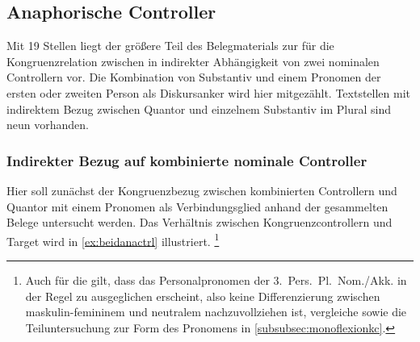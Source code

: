 
\subsection{Anaphorische Controller}

Mit 19 Stellen liegt der größere Teil des Belegmaterials zur \citet{kc} für die
Kongruenzrelation zwischen  in indirekter Abhängigkeit von zwei
nominalen Controllern vor. Die Kombination von Substantiv und einem Pronomen
der ersten oder zweiten Person als Diskurs\-anker wird hier mitgezählt.
Textstellen mit indirektem Bezug zwischen Quantor und einzelnem Substantiv im
Plural sind neun vorhanden.

\subsubsection{Indirekter Bezug auf kombinierte nominale Controller}
\label{subsubssec:iconomctrlpers}

Hier soll zunächst der Kongruenzbezug zwischen kombinierten Controllern und
Quantor mit einem Pronomen als Verbindungsglied anhand der gesammelten Belege
untersucht werden.
Das Verhältnis zwischen Kongruenzcontrollern und Target wird in
\cref{ex:beidanactrl} illustriert.%
%
	\footnote{Auch für die \citet{kc} gilt, dass das Personalpronomen der
		3.~Pers.\ Pl.\ Nom./Akk. in der Regel zu  ausgeglichen
		erscheint, also keine Differenzierung zwischen maskulin-femininem
		 und neutralem  nachzuvollziehen ist, vergleiche
		\textcites[213--214]{paul2007}[369, 390--397]{ksw2} sowie die
		Teiluntersuchung zur Form des Pronomens in
		\cref{subsubsec:monoflexionkc}.}

